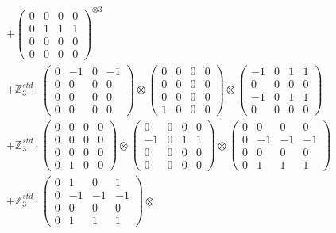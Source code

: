 \documentclass{article}
\begin{document}
{\begin{align}
        &+ \label{Rs16-Rc11-Solution-20-c16} \begin{pmatrix} 0 & 0 & 0 & 0 \\ 0 & 1 & 1 & 1 \\ 0 & 0 & 0 & 0 \\ 0 & 0 & 0 & 0 \end{pmatrix}^{\otimes 3} \\
        &+ \label{Rs16-Rc11-Solution-20-c17} \mathbb{Z}_3^{std} \cdot 
            \begin{pmatrix} 0 & -1 & 0 & -1 \\ 0 & 0 & 0 & 0 \\ 0 & 0 & 0 & 0 \\ 0 & 0 & 0 & 0 \end{pmatrix} \otimes 
            \begin{pmatrix} 0 & 0 & 0 & 0 \\ 0 & 0 & 0 & 0 \\ 0 & 0 & 0 & 0 \\ 1 & 0 & 0 & 0 \end{pmatrix} \otimes 
            \begin{pmatrix} -1 & 0 & 1 & 1 \\ 0 & 0 & 0 & 0 \\ -1 & 0 & 1 & 1 \\ 0 & 0 & 0 & 0 \end{pmatrix} \\ 
        &+ \label{Rs16-Rc11-Solution-20-c18} \mathbb{Z}_3^{std} \cdot 
            \begin{pmatrix} 0 & 0 & 0 & 0 \\ 0 & 0 & 0 & 0 \\ 0 & 0 & 0 & 0 \\ 0 & 1 & 0 & 0 \end{pmatrix} \otimes 
            \begin{pmatrix} 0 & 0 & 0 & 0 \\ -1 & 0 & 1 & 1 \\ 0 & 0 & 0 & 0 \\ 0 & 0 & 0 & 0 \end{pmatrix} \otimes 
            \begin{pmatrix} 0 & 0 & 0 & 0 \\ 0 & -1 & -1 & -1 \\ 0 & 0 & 0 & 0 \\ 0 & 1 & 1 & 1 \end{pmatrix} \\ 
        &+ \label{Rs16-Rc11-Solution-20-c19} \mathbb{Z}_3^{std} \cdot 
            \begin{pmatrix} 0 & 1 & 0 & 1 \\ 0 & -1 & -1 & -1 \\ 0 & 0 & 0 & 0 \\ 0 & 1 & 1 & 1 \end{pmatrix} \otimes 

\end{align}}
\end{document}
